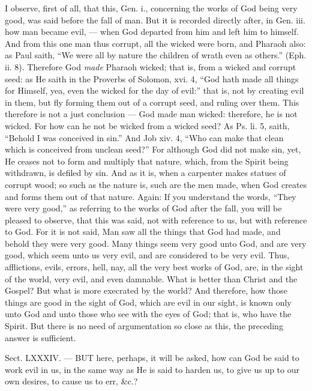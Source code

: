 I observe, first of all, that this, Gen. i., concerning the works of God being very good, was said before the fall of man. But it is recorded directly after, in Gen. iii. how man became evil, — when God departed from him and left him to himself. And from this one man thus corrupt, all the wicked were born, and Pharaoh also: as Paul saith, “We were all by nature the children of wrath even as others.” (Eph. ii. 8). Therefore God \emph{made }Pharaoh wicked; that is, from a wicked and corrupt seed: as He saith in the Proverbs of Solomon, xvi. 4, “God hath made all things for Himself, yea, even the wicked for the day of evil:” that is, not by creating evil in them, but fly forming them out of a corrupt seed, and ruling over them. This therefore is not a just conclusion — God made man wicked: therefore, he is not wicked. For how can he not be wicked from a wicked seed? As Ps. li. 5, saith, “Behold I was conceived in sin.” And Job xiv. 4, “Who can make that clean which is conceived from unclean seed?” For although God did not make sin, yet, He ceases not to form and multiply that nature, which, from the Spirit being withdrawn, is defiled by sin. And as it is, when a carpenter makes statues of corrupt wood; so such as the nature is, such are the men made, when God creates and forms them out of that nature. Again: If you understand the words, “They were very good,” as referring to the works of God after the fall, you will be pleased to observe, that this was said, not with reference to us, but with reference to God. For it is not said, Man saw all the things that God had made, and behold they were very good. Many things seem very good unto God, and are very good, which seem unto us very evil, and are considered to be very evil. Thus, afflictions, evils, errors, hell, nay, all the very best works of God, are, in the sight of the world, very evil, and even damnable. What is better than Christ and the Gospel? But what is more execrated by the world? And therefore, how those things are good in the sight of God, which are evil in our sight, is known only unto God and unto those who see with the eyes of God; that is, who have the Spirit. But there is no need of argumentation so close as this, the preceding answer is sufficient.


Sect. LXXXIV. — BUT here, perhaps, it will be asked, how can God be said to work evil in us, in the same way as He is said to harden us, to give us up to our own desires, to cause us to err, \&c.?

